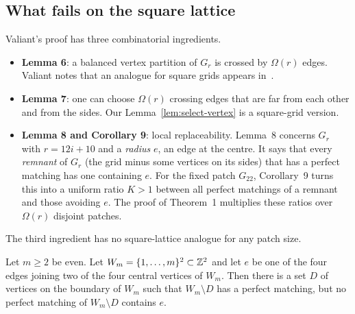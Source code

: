 \subsection{What fails on the square lattice}\label{sec:intro-fails}

Valiant's proof has three combinatorial ingredients.
\begin{itemize}
\item \textbf{Lemma 6}: a balanced vertex partition of $G_r$ is crossed by $\Omega(r)$ edges. Valiant notes that an analogue for square grids appears in~\cite{DeMilloEisenstatLipton75}.
\item \textbf{Lemma 7}: one can choose $\Omega(r)$ crossing edges that are far from each other and from the sides. Our Lemma~\ref{lem:select-vertex} is a square-grid version.
\item \textbf{Lemma 8 and Corollary 9}: local replaceability. Lemma~8 concerns $G_r$ with $r=12i+10$ and a \emph{radius} $e$, an edge at the centre. It says that every \emph{remnant} of $G_r$ (the grid minus some vertices on its sides) that has a perfect matching has one containing $e$. For the fixed patch $G_{22}$, Corollary~9 turns this into a uniform ratio $K>1$ between all perfect matchings of a remnant and those avoiding $e$. The proof of Theorem~1 multiplies these ratios over $\Omega(r)$ disjoint patches.
\end{itemize}
The third ingredient has no square-lattice analogue for any patch size.

\begin{proposition}\label{prop:flux}
Let $m\ge2$ be even. Let $W_m=\{1,\dots,m\}^2\subset\mathbb{Z}^2$ and let $e$ be one of the four edges joining two of the four central vertices of $W_m$. Then there is a set $D$ of vertices on the boundary of $W_m$ such that $W_m\setminus D$ has a perfect matching, but no perfect matching of $W_m\setminus D$ contains $e$.
\end{proposition}

